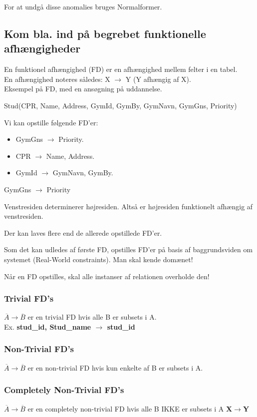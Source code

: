 For at undgå disse anomalies bruges Normalformer.

\subsection{Kom bla. ind på begrebet funktionelle afhængigheder}
En funktionel afhængighed (FD) er en afhængighed mellem felter i en tabel.\\
En afhængighed noteres således: X $\rightarrow$ Y (Y afhængig af X).\\
Eksempel på FD, med en ansøgning på uddannelse.

Stud(CPR, Name, Address, GymId, GymBy, GymNavn, GymGns, Priority)

Vi kan opstille følgende FD'er:
\begin{itemize}
	\item GymGns $\rightarrow$ Priority.
	\item CPR $\rightarrow$ Name, Address.
	\item GymId $\rightarrow$ GymNavn, GymBy.
\end{itemize}GymGns $\rightarrow$ Priority

Venstresiden determinerer højresiden. Altså er højresiden funktionelt afhængig af venstresiden.

Der kan laves flere end de allerede opstillede FD'er.

Som det kan udledes af første FD, opstilles FD'er på basis af baggrundsviden om systemet (Real-World constraints). Man skal kende domænet!

Når en FD opstilles, skal alle instanser af relationen overholde den!



\subsubsection{Trivial FD's}

$\overline{A} \rightarrow \overline{B}$ er en trivial FD hvis alle B er subsets i A.\\
Ex. \textbf{stud\_id, Stud\_name $\rightarrow$ stud\_id}

\subsubsection{Non-Trivial FD's}
$\overline{A} \rightarrow \overline{B}$ er en non-trivial FD hvis kun enkelte af B er subsets i A.
\subsubsection{Completely Non-Trivial FD's}
$\overline{A} \rightarrow \overline{B}$ er en completely non-trivial FD hvis alle B IKKE er subsets i A
\textbf{X$\rightarrow$Y}
